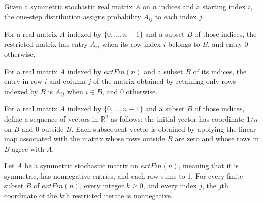 \begin{definition}
\label{Expander.stepPMF}
\leanok
{}
Given a symmetric stochastic real matrix $A$ on $n$ indices and a starting index $i$,
the one-step distribution assigns probability $A_{ij}$ to each index $j$.
\end{definition}

\begin{definition}
\label{Expander.resMatrix}
\leanok
For a real matrix $A$ indexed by $\{0,\ldots,n-1\}$ and a subset $B$ of those indices,
the restricted matrix has entry $A_{ij}$ when its row index $i$ belongs to $B$, and
entry $0$ otherwise.
\end{definition}

\begin{theorem}
\label{Expander.resMatrix_apply}
\leanok
{}
For a real matrix $A$ indexed by $	ext{Fin}(n)$ and a subset $B$ of its indices, the
entry in row $i$ and column $j$ of the matrix obtained by retaining only rows indexed by
$B$ is $A_{ij}$ when $i\in B$, and $0$ otherwise.
\end{theorem}

\begin{definition}
\label{Expander.resVec}
\leanok
{}
For a real matrix $A$ indexed by $\{0,\ldots,n-1\}$ and a subset $B$ of those indices,
define a sequence of vectors in $\mathbb R^n$ as follows: the initial vector has
coordinate $1/n$ on $B$ and $0$ outside $B$. Each subsequent vector is obtained by
applying the linear map associated with the matrix whose rows outside $B$ are zero and
whose rows in $B$ agree with $A$.
\end{definition}

\begin{theorem}
\label{Expander.resVec_nonneg}
\leanok
{}
Let $A$ be a symmetric stochastic matrix on $	ext{Fin}(n)$, meaning that it is
symmetric, has nonnegative entries, and each row sums to $1$. For every finite subset
$B$ of $	ext{Fin}(n)$, every integer $k\ge 0$, and every index $j$, the $j$th coordinate
of the $k$th restricted iterate is nonnegative.
\end{theorem}

